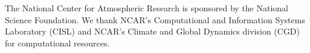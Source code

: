 \documentclass{agujournal}
\begin{document}
%
%
%
%
%
%
%


\acknowledgments
The National Center for Atmospheric Research is sponsored by the National Science Foundation. We thank NCAR's Computational and Information Systems Laboratory (CISL) and NCAR's Climate and Global Dynamics division (CGD) for computational resources.





\end{document}
